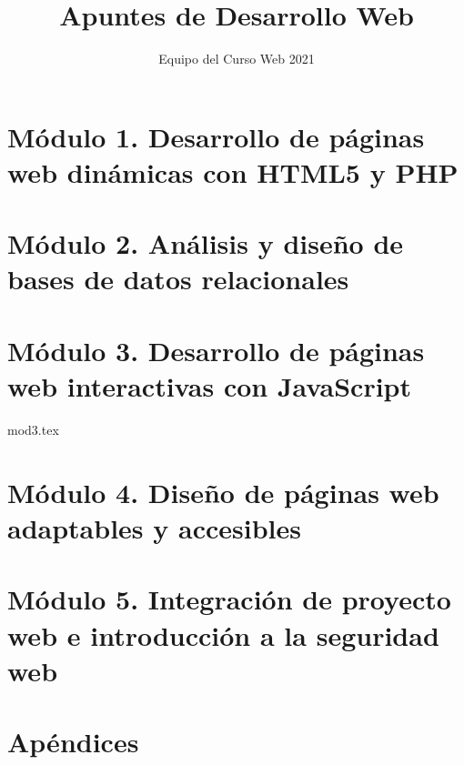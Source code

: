 \documentclass[12pt]{report}
\title{Apuntes de Desarrollo Web}
\author{Equipo del Curso Web 2021}
\begin{document}
	\maketitle
	\tableofcontents
	\chapter{Módulo 1. Desarrollo de páginas web dinámicas con HTML5 y PHP}
	\chapter{Módulo 2. Análisis y diseño de bases de datos relacionales}
	\chapter{Módulo 3. Desarrollo de páginas web interactivas con JavaScript}
		{mod3.tex}
	\chapter{Módulo 4. Diseño de páginas web adaptables y accesibles}
	\chapter{Módulo 5. Integración de proyecto web e introducción a la seguridad web}
	\appendix
	\chapter{Apéndices}
\end{document}
